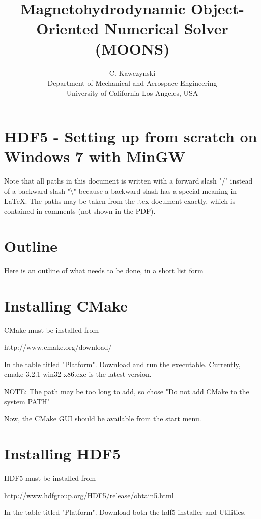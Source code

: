 \documentclass[11pt]{article}
\begin{document}
\doublespacing
\title{Magnetohydrodynamic Object-Oriented Numerical Solver (MOONS)}
\author{C. Kawczynski \\
Department of Mechanical and Aerospace Engineering \\
University of California Los Angeles, USA\\
}
\maketitle

\section{HDF5 - Setting up from scratch on Windows 7 with MinGW}
Note that all paths in this document is written with a forward slash "/" instead of a backward slash "\textbackslash" because a backward slash has a special meaning in LaTeX. The paths may be taken from the .tex document exactly, which is contained in comments (not shown in the PDF).

\section{Outline}
Here is an outline of what needs to be done, in a short list form

\section{Installing CMake}
CMake must be installed from

http://www.cmake.org/download/

In the table titled "Platform". Download and run the executable. Currently, cmake-3.2.1-win32-x86.exe is the latest version.

NOTE: The path may be too long to add, so chose "Do not add CMake to the system PATH"

Now, the CMake GUI should be available from the start menu.

\section{Installing HDF5}

HDF5 must be installed from

http://www.hdfgroup.org/HDF5/release/obtain5.html

In the table titled "Platform". Download both the hdf5 installer and Utilities.
\end{document}
